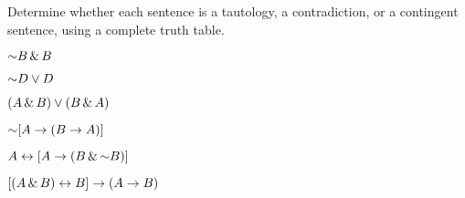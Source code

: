 \noindent\problempart Determine whether each sentence is a tautology, a contradiction, or a contingent sentence, using a complete truth table.
\begin{earg}
\item $\mathord{\sim} B \,\&\, B$ \vspace{.5ex}%


\item $\mathord{\sim} D \vee D$ \vspace{.5ex}%


\item $(A\,\&\, B) \vee (B\,\&\, A)$\vspace{.5ex} %


\item $\mathord{\sim}[A \rightarrow (B \rightarrow A)]$\vspace{.5ex} %


\item $A \leftrightarrow [A \rightarrow (B \,\&\, \mathord{\sim} B)]$ \vspace{.5ex}%


\item $[(A \,\&\, B) \leftrightarrow B] \rightarrow (A \rightarrow B)$ \vspace{.5ex}%

\end{earg}



